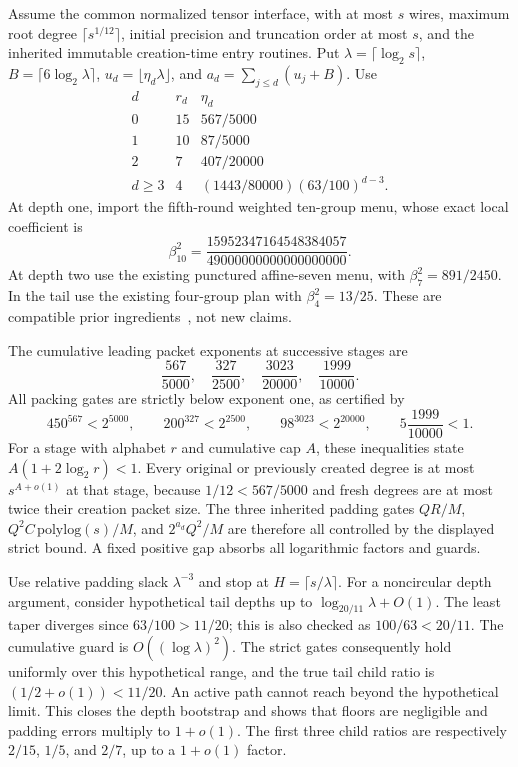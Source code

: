 Assume the common normalized tensor interface, with at most $s$ wires,
maximum root degree $\lceil s^{1/12}\rceil$, initial precision and
truncation order at most $s$, and the inherited immutable creation-time
entry routines. Put $\lambda=\lceil\log_2s\rceil$,
$B=\lceil6\log_2\lambda\rceil$, $u_d=\lfloor\eta_d\lambda\rfloor$,
and $a_d=\sum_{j\le d}(u_j+B)$. Use
\[
\begin{array}{c|c|c}
 d&r_d&\eta_d\\\hline
0&15&567/5000\\
1&10&87/5000\\
2&7&407/20000\\
d\ge3&4&(1443/80000)(63/100)^{d-3}.
\end{array}
\]
At depth one, import the fifth-round weighted ten-group menu, whose
exact local coefficient is
\[
 \beta_{10}^2=\frac{15952347164548384057}{49000000000000000000}.
\]
At depth two use the existing punctured affine-seven menu, with
$\beta_7^2=891/2450$. In the tail use the existing four-group plan with
$\beta_4^2=13/25$. These are compatible prior ingredients~\cite{pairwise,affinegeometry}, not new claims.

The cumulative leading packet exponents at successive stages are
\[
 \frac{567}{5000},\quad \frac{327}{2500},\quad
 \frac{3023}{20000},\quad \frac{1999}{10000}.
\]
All packing gates are strictly below exponent one, as certified by
\[
 450^{567}<2^{5000},\qquad
 200^{327}<2^{2500},\qquad
 98^{3023}<2^{20000},\qquad
 5\frac{1999}{10000}<1.
\]
For a stage with alphabet $r$ and cumulative cap $A$, these inequalities
state $A(1+2\log_2r)<1$. Every original or previously created degree is
at most $s^{A+o(1)}$ at that stage, because $1/12<567/5000$ and fresh
degrees are at most twice their creation packet size. The three inherited
padding gates $QR/M$, $Q^2C\,\mathrm{polylog}(s)/M$, and $2^{a_d}Q^2/M$
are therefore all controlled by the displayed strict bound. A fixed
positive gap absorbs all logarithmic factors and guards.

Use relative padding slack $\lambda^{-3}$ and stop at
$H=\lceil s/\lambda\rceil$. For a noncircular depth argument, consider
hypothetical tail depths up to $\log_{20/11}\lambda+O(1)$. The least
taper diverges since $63/100>11/20$; this is also checked as
$100/63<20/11$. The cumulative guard is $O((\log\lambda)^2)$.
The strict gates consequently hold uniformly over this hypothetical range,
and the true tail child ratio is $(1/2+o(1))<11/20$. An active path cannot
reach beyond the hypothetical limit. This closes the depth bootstrap and
shows that floors are negligible and padding errors multiply to $1+o(1)$.
The first three child ratios are respectively $2/15$, $1/5$, and $2/7$,
up to a $1+o(1)$ factor.

